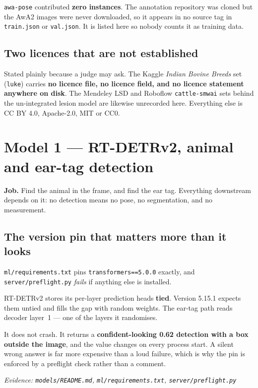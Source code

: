 \documentclass[11pt,a4paper]{article}
\newcommand{\evidence}[1]{{\small\color{soft}\textit{Evidence: #1}}}
\newcommand{\bad}[1]{{\color{invented}\textbf{#1}}}
\begin{document}
\texttt{awa-pose} contributed \textbf{zero instances}. The annotation
repository was cloned but the AwA2 images were never downloaded, so it appears
in no source tag in \texttt{train.json} or \texttt{val.json}. It is listed here
so nobody counts it as training data.

\subsection*{Two licences that are not established}

Stated plainly because a judge may ask. The Kaggle \emph{Indian Bovine Breeds}
set (\texttt{luke}) carries \bad{no licence file, no licence field, and no
licence statement anywhere on disk}. The Mendeley LSD and Roboflow
\texttt{cattle-smwai} sets behind the un-integrated lesion model are likewise
unrecorded here. Everything else is CC BY 4.0, Apache-2.0, MIT or CC0.

\section{Model 1 --- RT-DETRv2, animal and ear-tag detection}

\textbf{Job.} Find the animal in the frame, and find the ear tag. Everything
downstream depends on it: no detection means no pose, no segmentation, and no
measurement.

\subsection*{The version pin that matters more than it looks}

\texttt{ml/requirements.txt} pins \texttt{transformers==5.0.0} exactly, and
\texttt{server/preflight.py} \emph{fails} if anything else is installed.

RT-DETRv2 stores its per-layer prediction heads \textbf{tied}. Version 5.15.1
expects them untied and fills the gap with random weights. The ear-tag path
reads decoder layer~1 --- one of the layers it randomises.

It does not crash. It returns a \bad{confident-looking 0.62 detection with a
box outside the image}, and the value changes on every process start. A silent
wrong answer is far more expensive than a loud failure, which is why the pin is
enforced by a preflight check rather than a comment.

\evidence{\texttt{models/README.md}, \texttt{ml/requirements.txt},
\texttt{server/preflight.py}}
\end{document}
